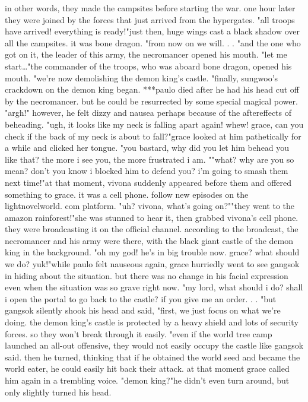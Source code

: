  in other words, they made the campsites before starting the war.
one hour later they were joined by the forces that just arrived from the hypergates.
"all troops have arrived! everything is ready!"just then, huge wings cast a black shadow over all the campsites.
 it was bone dragon.
"from now on we will.
.
.
"and the one who got on it, the leader of this army, the necromancer opened his mouth.
"let me start…"the commander of the troops, who was aboard bone dragon, opened his mouth.
 "we're now demolishing the demon king's castle.
"finally, sungwoo's crackdown on the demon king began.
***paulo died after he had his head cut off by the necromancer.
 but he could be resurrected by some special magical power.
"argh!"
however, he felt dizzy and nausea perhaps because of the aftereffects of beheading.
"ugh, it looks like my neck is falling apart again! whew! grace, can you check if the back of my neck is about to fall?"grace looked at him pathetically for a while and clicked her tongue.
"you bastard, why did you let him behead you like that? the more i see you, the more frustrated i am.
""what? why are you so mean? don't you know i blocked him to defend you? i'm going to smash them next time!"at that moment, vivona suddenly appeared before them and offered something to grace.
 it was a cell phone.
follow new episodes on the lightnov‌elworld.
com platform.
"uh? vivona, what's going on?""they went to the amazon rainforest!"she was stunned to hear it, then grabbed vivona's cell phone.
they were broadcasting it on the official channel.
 according to the broadcast, the necromancer and his army were there, with the black giant castle of the demon king in the background.
"oh my god! he's in big trouble now.
 grace? what should we do? yuk!"while paulo felt nauseous again, grace hurriedly went to see gangsok in hiding about the situation.
but there was no change in his facial expression even when the situation was so grave right now.
 "my lord, what should i do? shall i open the portal to go back to the castle? if you give me an order.
.
.
"but gangsok silently shook his head and said, "first, we just focus on what we're doing.
 the demon king's castle is protected by a heavy shield and lots of security forces.
 so they won't break through it easily.
"even if the world tree camp launched an all-out offensive, they would not easily occupy the castle like gangsok said.
 then he turned, thinking that if he obtained the world seed and became the world eater, he could easily hit back their attack.
at that moment grace called him again in a trembling voice.
 "demon king?"he didn't even turn around, but only slightly turned his head.
